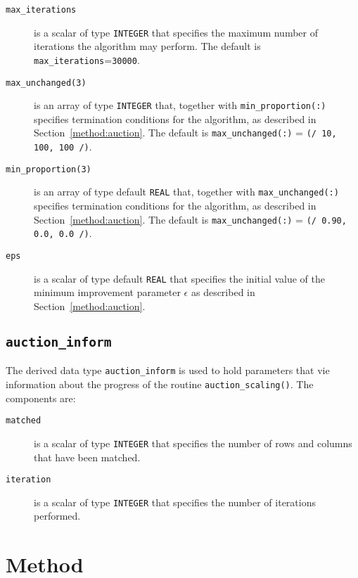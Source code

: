 \begin{description}

\item[\texttt{max\_iterations}] is a scalar of type \texttt{INTEGER} that specifies the maximum number of iterations the algorithm may perform. The default is \texttt{max\_iterations}=\texttt{30000}.

\item[\texttt{max\_unchanged(3)}] is an array of type \texttt{INTEGER} that, together with \texttt{min\_proportion(:)} specifies termination conditions for the algorithm, as described in Section~\ref{method:auction}. The default is \texttt{max\_unchanged(:)} = \texttt{(/ 10, 100, 100 /)}.

\item[\texttt{min\_proportion(3)}] is an array of type default \texttt{REAL} that, together with \texttt{max\_unchanged(:)} specifies termination conditions for the algorithm, as described in Section~\ref{method:auction}. The default is \texttt{max\_unchanged(:)} = \texttt{(/ 0.90, 0.0, 0.0 /)}.

\item[\texttt{eps}] is a scalar of type default \texttt{REAL} that specifies the initial value of the minimum improvement parameter $\epsilon$ as described in Section~\ref{method:auction}.

\end{description}

\subsection{\texttt{auction\_inform}} \label{type:auction_inform}

The derived data type \texttt{auction\_inform} is used to hold parameters that vie information about the progress of the routine \texttt{auction\_scaling()}. The components are:

\begin{description}

\item[\texttt{matched}] is a scalar of type \texttt{INTEGER} that specifies the number of rows and columns that have been matched.

\item[\texttt{iteration}] is a scalar of type \texttt{INTEGER} that specifies the number of iterations performed.

\end{description}

\section{Method} \label{method}

